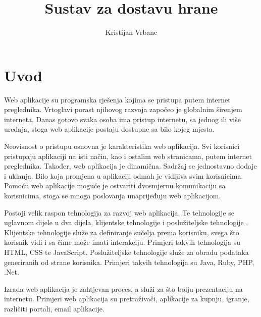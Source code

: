 \documentclass[times, utf8, zavrsni, numeric]{fer}
\begin{document}

\title{Sustav za dostavu hrane}

\author{Kristijan Vrbanc}

\maketitle

\izvornik

\zahvala{}

\tableofcontents

\chapter{Uvod}
Web aplikacije su programska rješenja kojima se pristupa putem internet preglednika. Vrtoglavi porast njihovog razvoja započeo je globalnim širenjem interneta. Danas gotovo svaka osoba ima pristup internetu, sa jednog ili više uređaja, stoga web aplikacije postaju dostupne sa bilo kojeg mjesta. 

Neovisnost o pristupu osnovna je karakteristika web aplikacija. Svi korisnici pristupaju aplikaciji na isti način, kao i ostalim web stranicama, putem internet preglednika. Također, web aplikacija je dinamična. Sadržaj se jednostavno dodaje i uklanja. Bilo koja promjena u aplikaciji odmah je vidljiva svim korisnicima. Pomoću web aplikacije moguće je ostvariti dvosmjernu komunikaciju sa korisnicima, stoga se mnoga poslovanja unaprijeđuju web aplikacijom.

Postoji velik raspon tehnologija za razvoj web aplikacija. Te tehnologije se uglavnom dijele u dva dijela, klijentske tehnologije  i poslužiteljske tehnologije . Klijentske tehnologije služe za definiranje sučelja prema korisniku, svega što korisnik vidi i sa čime može imati interakciju. Primjeri takvih tehnologija su HTML, CSS te JavaScript. Poslužiteljske tehnologije služe za obradu podataka generiranih od strane korisnika. Primjeri takvih tehnologija su Java, Ruby, PHP, .Net.

Izrada web aplikacija je zahtjevan proces, a služi za što bolju prezentaciju na internetu. Primjeri web aplikacija su pretraživači, aplikacije za kupnju, igranje, različiti portali, email aplikacije.\\
\end{document}
